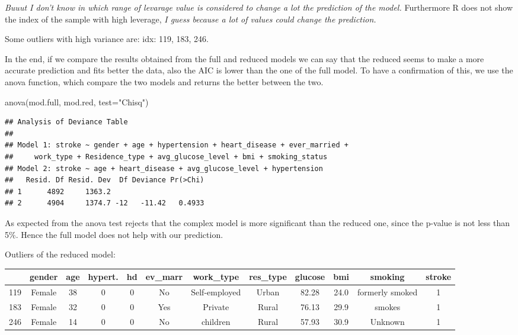 \documentclass[
]{article}
\newenvironment{Shaded}{\begin{snugshade}}{\end{snugshade}}
\newcommand{\AttributeTok}[1]{\textcolor[rgb]{0.77,0.63,0.00}{#1}}
\newcommand{\FunctionTok}[1]{\textcolor[rgb]{0.00,0.00,0.00}{#1}}
\newcommand{\NormalTok}[1]{#1}
\newcommand{\StringTok}[1]{\textcolor[rgb]{0.31,0.60,0.02}{#1}}
\begin{document}
\emph{Buuut I don't know in which range of levarage value is considered
to change a lot the prediction of the model.} Furthermore R does not
show the index of the sample with high leverage, \emph{I guess because a
lot of values could change the prediction.}

Some outliers with high variance are: idx: 119, 183, 246.

In the end, if we compare the results obtained from the full and reduced
models we can say that the reduced seems to make a more accurate
prediction and fits better the data, also the AIC is lower than the one
of the full model. To have a confirmation of this, we use the anova
function, which compare the two models and returns the better between
the two.

\begin{Shaded}
\begin{Highlighting}[]
\FunctionTok{anova}\NormalTok{(mod.full, mod.red, }\AttributeTok{test=}\StringTok{"Chisq"}\NormalTok{)}
\end{Highlighting}
\end{Shaded}

\begin{verbatim}
## Analysis of Deviance Table
## 
## Model 1: stroke ~ gender + age + hypertension + heart_disease + ever_married + 
##     work_type + Residence_type + avg_glucose_level + bmi + smoking_status
## Model 2: stroke ~ age + heart_disease + avg_glucose_level + hypertension
##   Resid. Df Resid. Dev  Df Deviance Pr(>Chi)
## 1      4892     1363.2                      
## 2      4904     1374.7 -12   -11.42   0.4933
\end{verbatim}

As expected from the anova test rejects that the complex model is more
significant than the reduced one, since the p-value is not less than
5\%. Hence the full model does not help with our prediction.

Outliers of the reduced model:

\begin{longtable}[]{@{}lccccccccccc@{}}
\toprule
& gender & age & hypert. & hd & ev\_marr & work\_type & res\_type &
glucose & bmi & smoking & stroke \\
\midrule
\endhead
119 & Female & 38 & 0 & 0 & No & Self-employed & Urban & 82.28 & 24.0 &
formerly smoked & 1 \\
183 & Female & 32 & 0 & 0 & Yes & Private & Rural & 76.13 & 29.9 &
smokes & 1 \\
246 & Female & 14 & 0 & 0 & No & children & Rural & 57.93 & 30.9 &
Unknown & 1 \\
\bottomrule
\end{longtable}
\end{document}
